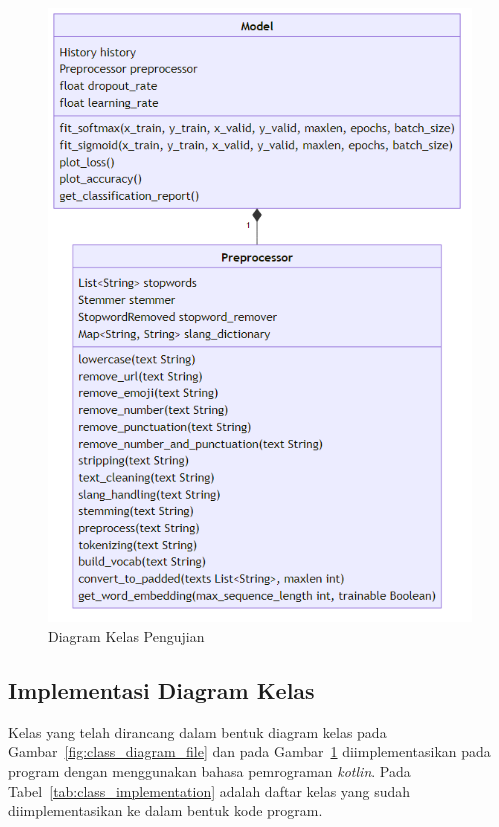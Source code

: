 \begin{figure}[H]
  \centering
  \includegraphics[scale=0.4]{assets/class_diagram_test.png}
  \caption{Diagram Kelas Pengujian}
  \label{fig:class_diagram_kalimat}
\end{figure}

\subsection{Implementasi Diagram Kelas}
Kelas yang telah dirancang dalam bentuk diagram kelas pada Gambar~\ref{fig:class_diagram_file} dan pada
Gambar~\ref{fig:class_diagram_kalimat} diimplementasikan pada program dengan
menggunakan bahasa pemrograman \emph{kotlin}. Pada Tabel~\ref{tab:class_implementation} adalah daftar
kelas yang sudah diimplementasikan ke dalam bentuk kode program.

